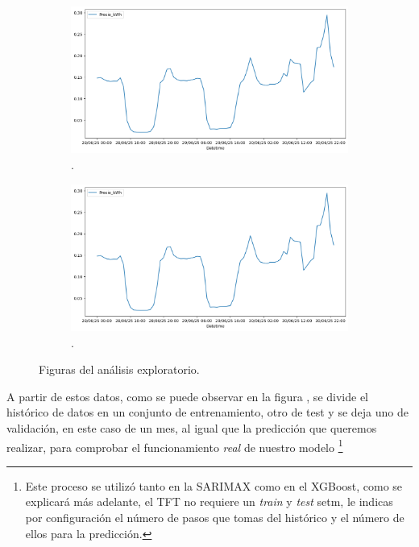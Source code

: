 \begin{figure}[H]
\begin{subfigure}[b]{0.35\textwidth}
\centering
\includegraphics[width=\textwidth]{figuras/histoico.png}
\caption[Boxplot diario]{.}
\label{Booxplotdiario}
\end{subfigure}
\begin{subfigure}[b]{0.35\textwidth}
\centering
\includegraphics[width=\textwidth]{figuras/histoico.png}
\caption[Boxplot anual]{.}
\label{Boxplot}
\end{subfigure}
\caption{Figuras del análisis exploratorio.}
\label{Análisis exploratorio}
\end{figure}
A partir de estos datos, como se puede observar en la figura , se divide el histórico de datos en un conjunto de entrenamiento, otro de test y se deja uno de validación, en este caso de un mes, al igual que la predicción que queremos realizar, para comprobar el funcionamiento \textit{real} de nuestro modelo \footnote{Este proceso se utilizó tanto en la SARIMAX como en el XGBoost, como se explicará más adelante, el TFT no requiere un \textit{train} y \textit{test} setm, le indicas por configuración el número de pasos que tomas del histórico y el número de ellos para la predicción.}

